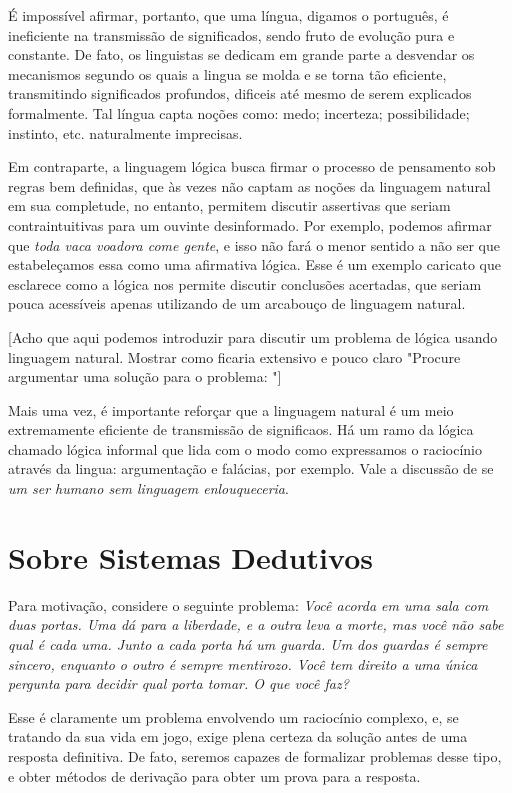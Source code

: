 É impossível afirmar, portanto, que uma língua, digamos o português, é ineficiente na transmissão de significados, sendo fruto de evolução pura e constante.
De fato, os linguistas se dedicam em grande parte a desvendar os mecanismos segundo os quais a lingua se molda e se torna tão eficiente, transmitindo significados profundos, dificeis até mesmo de serem explicados formalmente.
Tal língua capta noções como: medo; incerteza; possibilidade; instinto, etc. naturalmente imprecisas.

Em contraparte, a linguagem lógica busca firmar o processo de pensamento sob regras bem definidas, que às vezes não captam as noções da linguagem natural em sua completude, no entanto, permitem discutir assertivas que seriam contraintuitivas para um ouvinte desinformado.
Por exemplo, podemos afirmar que \textit{toda vaca voadora come gente}, e isso não fará o menor sentido a não ser que estabeleçamos essa como uma afirmativa lógica.
Esse é um exemplo caricato que esclarece como a lógica nos permite discutir conclusões acertadas, que seriam pouca acessíveis apenas utilizando de um arcabouço de linguagem natural.

[Acho que aqui podemos introduzir para discutir um problema de lógica usando linguagem natural. Mostrar como ficaria extensivo e pouco claro "Procure argumentar uma solução para o problema: "]

Mais uma vez, é importante reforçar que a linguagem natural é um meio extremamente eficiente de transmissão de significaos.
Há um ramo da lógica chamado lógica informal que lida com o modo como expressamos o raciocínio através da lingua: argumentação e falácias, por exemplo.
Vale a discussão de se \textit{um ser humano sem linguagem enlouqueceria}.

\section{Sobre Sistemas Dedutivos}
Para motivação, considere o seguinte problema: \textit{Você acorda em uma sala com duas portas. Uma dá para a liberdade, e a outra leva a morte, mas você não sabe qual é cada uma.
Junto a cada porta há um guarda. Um dos guardas é sempre sincero, enquanto o outro é sempre mentirozo. Você tem direito a uma única pergunta para decidir qual porta tomar. O que você faz?}

Esse é claramente um problema envolvendo um raciocínio complexo, e, se tratando da sua vida em jogo, exige plena certeza da solução antes de uma resposta definitiva.
De fato, seremos capazes de formalizar problemas desse tipo, e obter métodos de derivação para obter um prova para a resposta.

